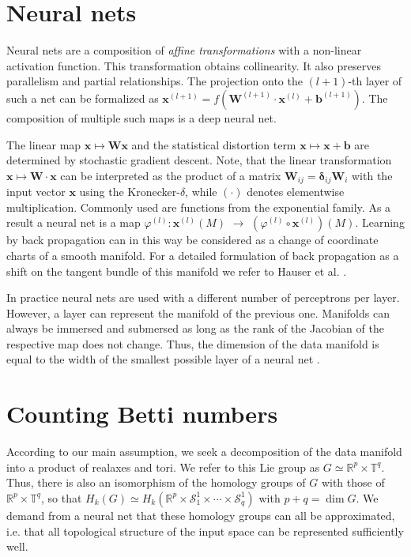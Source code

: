 \documentclass[runningheads,orivec]{llncs}
\begin{document}
\section{Neural nets}
\label{sec:neuralnets}
Neural nets are a composition of \emph{affine transformations} with a non-linear activation function. This transformation obtains collinearity. It also preserves parallelism and partial relationships. The projection onto the $(l+1)$-th layer of such a net can be formalized as $\textbf{x}^{(l+1)} = f(\mathbf{W}^{(l+1)} \cdot \textbf{x}^{(l)}+\textbf{b}^{(l+1)}).$ The composition of multiple such maps is a deep neural net.

The linear map $\textbf{x} \mapsto \mathbf{W} \textbf{x}$ and the statistical distortion term $\textbf{x} \mapsto \textbf{x}+\textbf{b}$ are determined by stochastic gradient descent.  Note, that the linear transformation $\textbf{x} \mapsto \mathbf{W} \cdot \textbf{x}$ can be interpreted as the product of a matrix $\mathbf{W}_{ij} = \mathbf{\delta}_{ij}\mathbf{W}_i$ with the input vector $\textbf{x}$ using the Kronecker-$\delta$, while $(\cdot)$ denotes elementwise multiplication. Commonly used are functions from the exponential family. As a result a neural net is a map $\varphi^{(l)}:\textbf{x}^{(l)}(M)$ $\rightarrow$ $(\varphi^{(l)} \circ \textbf{x}^{(l)})(M)$. Learning by back propagation can in this way be considered as a change of coordinate charts of a smooth manifold. For a detailed formulation of back propagation as a shift on the tangent bundle of this manifold we refer to Hauser et al. \cite{HauserR17}.

In practice neural nets are used with a different number of perceptrons per layer. However, a layer can represent the manifold of the previous one. Manifolds can always be immersed and submersed as long as the rank of the Jacobian of the respective map does not change. Thus, the dimension of the data manifold is equal to the width of the smallest possible layer of a neural net \cite{HauserR17}. 

\section{Counting Betti numbers}
According to our main assumption, we seek a decomposition of the data manifold into a product of realaxes and tori. We refer to this Lie group as $G \simeq \mathbb{R}^p \times \mathbb{T}^q$. Thus, there is also an isomorphism of the homology groups of $G$ with those of $\mathbb{R}^p \times \mathbb{T}^q$, so that $H_k(G) \simeq H_k(\mathbb{R}^p \times \mathcal{S}^{1}_{1}\times\cdots\times\mathcal{S}^{1}_{q})$ with $p+q = \dim G$. We demand from a neural net that these homology groups can all be approximated, i.e. that all topological structure of the input space can be represented sufficiently well. 
\end{document}
